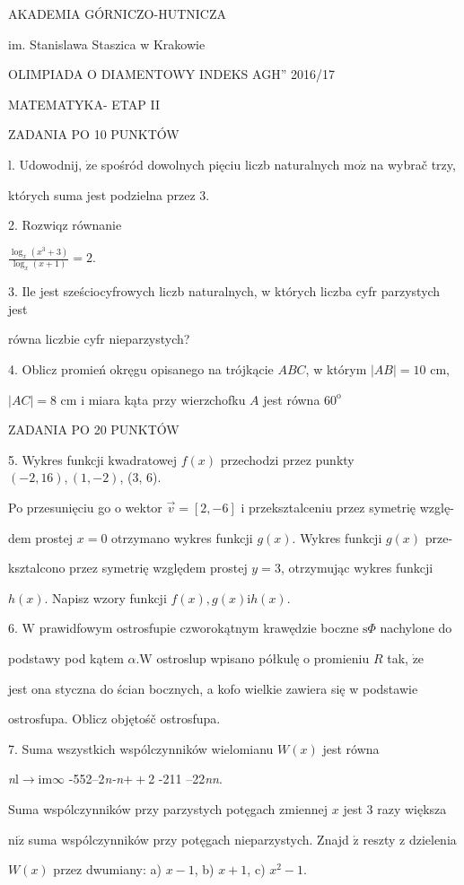 \documentclass[a4paper,12pt]{article}
\begin{document}
AKADEMIA GÓRNICZO-HUTNICZA

im. Stanislawa Staszica w Krakowie

OLIMPIADA O DIAMENTOWY INDEKS AGH'' 2016/17

MATEMATYKA- ETAP II

ZADANIA PO 10 PUNKTÓW

l. Udowodnij, $\dot{\mathrm{z}}\mathrm{e}$ spośród dowolnych pięciu liczb naturalnych $\mathrm{m}\mathrm{o}\dot{\mathrm{z}}$ na wybrač trzy,

których suma jest podzielna przez 3.

2. Rozwiqz równanie

$\displaystyle \frac{\log_{x}(x^{3}+3)}{\log_{x}(x+1)}=2.$

3. Ile jest sześciocyfrowych liczb naturalnych, w których liczba cyfr parzystych jest

równa liczbie cyfr nieparzystych?

4. Oblicz promień okręgu opisanego na trójkącie $ABC$, w którym $|AB|=10$ cm,

$|AC|=8$ cm i miara kąta przy wierzchofku $A$ jest równa $60^{\mathrm{o}}$

ZADANIA PO 20 PUNKTÓW

5. Wykres funkcji kwadratowej $f(x)$ przechodzi przez punkty $(-2,16), (1,-2)$, (3, 6).

Po przesunięciu go o wektor $\vec{v}=[2,-6]$ i przeksztalceniu przez symetrię wzglę-

dem prostej $x=0$ otrzymano wykres funkcji $g(x)$. Wykres funkcji $g(x)$ prze-

ksztalcono przez symetrię względem prostej $y=3$, otrzymując wykres funkcji

$h(x)$. Napisz wzory funkcji $f(x), g(x)\mathrm{i}h(x).$

6. $\mathrm{W}$ prawidfowym ostrosfupie czworokątnym krawędzie boczne $\mathrm{s}\Phi$ nachylone do

podstawy pod kątem $\alpha. \mathrm{W}$ ostroslup wpisano półkulę o promieniu $R$ tak, $\dot{\mathrm{z}}\mathrm{e}$

jest ona styczna do ścian bocznych, a kofo wielkie zawiera się w podstawie

ostrosfupa. Oblicz objętośč ostrosfupa.

7. Suma wszystkich wspólczynników wielomianu $W(x)$ jest równa

{\it n}l$\rightarrow$im$\infty$ -552--2{\it n-n}$++$2 -211 --22{\it nn}.

Suma wspólczynników przy parzystych potęgach zmiennej $x$ jest 3 razy większa

$\mathrm{n}\mathrm{i}\dot{\mathrm{z}}$ suma wspólczynników przy potęgach nieparzystych. Znajd $\acute{\mathrm{z}}$ reszty z dzielenia

$W(x)$ przez dwumiany: a) $x-1$, b) $x+1$, c) $x^{2}-1.$
\end{document}
